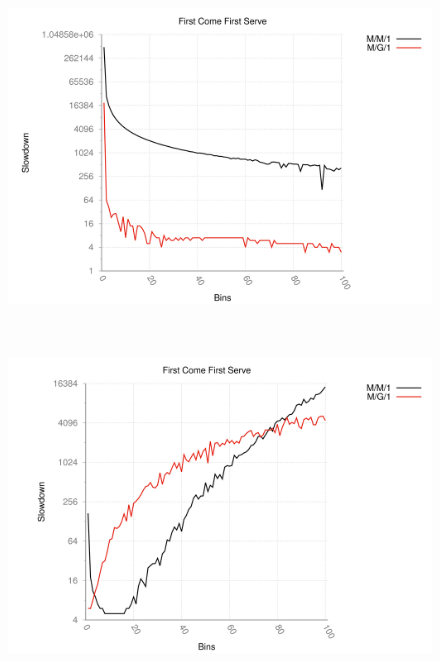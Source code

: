 \begin{figure}[ht!]
 \centering
 \captionsetup{justification=centering}
 \begin{minipage}[]{0.48\linewidth}
  \centering
 \includegraphics[width=\linewidth]{Figures/task4/fcfs.png}
 \label{fig3} 
 \end{minipage}~~~~\begin{minipage}[]{0.48\linewidth}
  \centering
  \includegraphics[width=\linewidth]{Figures/task4/sjf.png}
  \label{fig4}
 \end{minipage}
\end{figure}